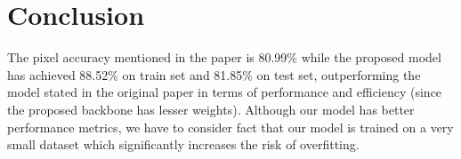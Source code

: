 \section{Conclusion}
\label{sec:conclusion}

The pixel accuracy mentioned in the paper is 80.99\% while the proposed model has achieved 88.52\% on train set and 81.85\% on test set, outperforming the model stated in the original paper in terms of performance and efficiency (since the proposed backbone has lesser weights). Although our model has better performance metrics, we have to consider fact that our model is trained on a very small dataset which significantly increases the risk of overfitting.
